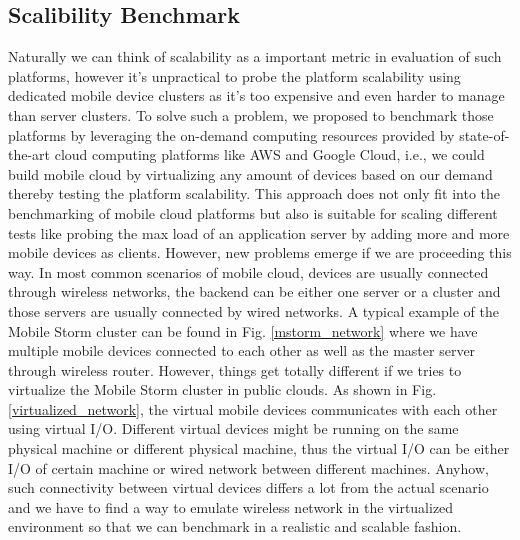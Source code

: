 \documentclass[journal,comsoc]{IEEEtran}
\begin{document}
\subsection{Scalibility Benchmark}
Naturally we can think of scalability as a important metric in evaluation of such platforms, however it's unpractical to probe the platform scalability using dedicated mobile device clusters as it's too expensive and even harder to manage than server clusters. To solve such a problem, we proposed to benchmark those platforms by leveraging the on-demand computing resources provided by state-of-the-art cloud computing platforms like AWS and Google Cloud, i.e., we could build mobile cloud by virtualizing any amount of devices based on our demand thereby testing the platform scalability. This approach does not only fit into the benchmarking of mobile cloud platforms but also is suitable for scaling different tests like probing the max load of an application server by adding more and more mobile devices as clients. However, new problems emerge if we are proceeding this way. In most common scenarios of mobile cloud, devices are usually connected through wireless networks, the backend can be either one server or a cluster and those servers are usually connected by wired networks. A typical example of the Mobile Storm cluster can be found in Fig. \ref{mstorm_network} where we have multiple mobile devices connected to each other as well as the master server through wireless router. However, things get totally different if we tries to virtualize the Mobile Storm cluster in public clouds. As shown in Fig. \ref{virtualized_network}, the virtual mobile devices communicates with each other using virtual I/O. Different virtual devices might be running on the same physical machine or different physical machine, thus the virtual I/O can be either I/O of certain machine or wired network between different machines. Anyhow, such connectivity between virtual devices differs a lot from the actual scenario and we have to find a way to emulate wireless network in the virtualized environment so that we can benchmark in a realistic and scalable fashion. 
\end{document}
